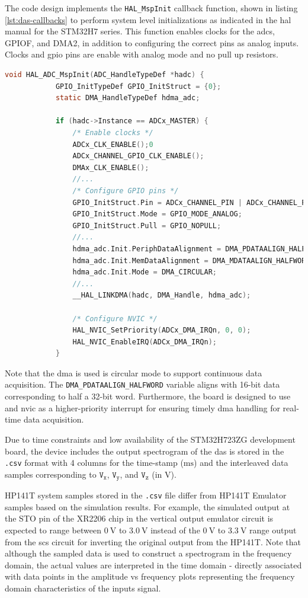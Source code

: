 \documentclass[class=report,11pt,crop=false]{standalone}
\begin{document}
	The code design implements the \texttt{HAL\_MspInit} callback function, shown in listing \ref{lst:das-callbacks} to perform system level initializations as indicated in the \acrshort{hal} manual for the STM32H7 series. This function enables clocks for the \acrshort{adc}s, GPIOF, and DMA2, in addition to configuring the correct pins as analog inputs. Clocks and \acrshort{gpio} pins are enable with analog mode and no pull up resistors. 
	\begin{lstlisting}[language=C, label={lst:das-callbacks}, caption={Showing conversion callbacks for processing \acrshort{adc} data when the \acrshort{dma} fills half.}]
		void HAL_ADC_MspInit(ADC_HandleTypeDef *hadc) {
			GPIO_InitTypeDef GPIO_InitStruct = {0};
			static DMA_HandleTypeDef hdma_adc;
			
			if (hadc->Instance == ADCx_MASTER) {
				/* Enable clocks */
				ADCx_CLK_ENABLE();0
				ADCx_CHANNEL_GPIO_CLK_ENABLE();
				DMAx_CLK_ENABLE();
				//...
				/* Configure GPIO pins */
				GPIO_InitStruct.Pin = ADCx_CHANNEL_PIN | ADCx_CHANNEL_PIN2 | ADCx_CHANNEL_PIN3;
				GPIO_InitStruct.Mode = GPIO_MODE_ANALOG;
				GPIO_InitStruct.Pull = GPIO_NOPULL;
				//...
				hdma_adc.Init.PeriphDataAlignment = DMA_PDATAALIGN_HALFWORD; // 16-bit
				hdma_adc.Init.MemDataAlignment = DMA_MDATAALIGN_HALFWORD;
				hdma_adc.Init.Mode = DMA_CIRCULAR;
				//...
				__HAL_LINKDMA(hadc, DMA_Handle, hdma_adc);
				
				/* Configure NVIC */
				HAL_NVIC_SetPriority(ADCx_DMA_IRQn, 0, 0);
				HAL_NVIC_EnableIRQ(ADCx_DMA_IRQn);
			}
	\end{lstlisting}
	Note that the \acrshort{dma} is used is circular mode to support continuous data acquisition. The \texttt{DMA\_PDATAALIGN\_HALFWORD} variable aligns with 16-bit data corresponding to half a 32-bit word. Furthermore, the board is designed to use and \acrfull{nvic} as a higher-priority interrupt for ensuring timely \acrshort{dma} handling for real-time data acquisition. 
	
	Due to time constraints and low availability of the STM32H723ZG development board, the device includes the output spectrogram of the \acrshort{das} is stored in the \texttt{.csv} format with 4 columns for the time-stamp ($\si{\milli\second}$) and the interleaved data samples corresponding to $\texttt{V}_\texttt{x}$, $\texttt{V}_\texttt{y}$, and $\texttt{V}_\texttt{z}$ (in $\si{\volt}$). 
	
	HP141T system samples stored in the \texttt{.csv} file differ from HP141T Emulator samples based on the simulation results. For example, the simulated output at the STO pin of the XR2206 chip in the vertical output emulator circuit is expected to range between $\SI{0}{\volt}$ to $\SI{3.0}{\volt}$ instead of the $\SI{0}{\volt}$ to $\SI{3.3}{\volt}$ range output from the \acrshort{scs} circuit for inverting the original output from the HP141T. Note that although the sampled data is used to construct a spectrogram in the frequency domain, the actual values are interpreted in the time domain - directly associated with data points in the amplitude vs frequency plots representing the frequency domain characteristics of the inputs signal. 
	
\end{document}
